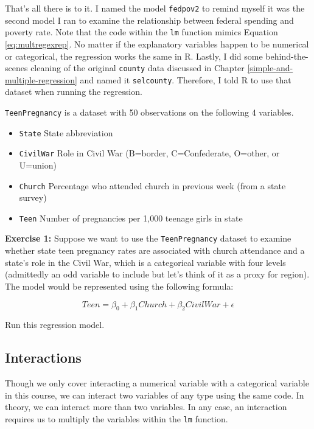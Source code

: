 \documentclass[
]{book}
\providecommand{\tightlist}{%
  \setlength{\itemsep}{0pt}\setlength{\parskip}{0pt}}
\newenvironment{rmdblock}[1]
  {\begin{shaded*}
  }
  {\end{shaded*}
  }
\newenvironment{learncheck}
  {\begin{rmdblock}{warning}}
  {\end{rmdblock}}
\begin{document}
That's all there is to it. I named the model \texttt{fedpov2} to remind myself it was the second model I ran to examine the relationship between federal spending and poverty rate. Note that the code within the \texttt{lm} function mimics Equation \eqref{eq:multregexrep}. No matter if the explanatory variables happen to be numerical or categorical, the regression works the same in R. Lastly, I did some behind-the-scenes cleaning of the original \texttt{county} data discussed in Chapter \ref{simple-and-multiple-regression} and named it \texttt{selcounty}. Therefore, I told R to use that dataset when running the regression.

\texttt{TeenPregnancy} is a dataset with 50 observations on the following 4 variables.

\begin{itemize}
\tightlist
\item
  \texttt{State} State abbreviation
\item
  \texttt{CivilWar} Role in Civil War (B=border, C=Confederate, O=other, or U=union)
\item
  \texttt{Church} Percentage who attended church in previous week (from a state survey)
\item
  \texttt{Teen} Number of pregnancies per 1,000 teenage girls in state
\end{itemize}

\begin{learncheck}
\textbf{Exercise 1:} Suppose we want to use the \texttt{TeenPregnancy}
dataset to examine whether state teen pregnancy rates are associated
with church attendance and a state's role in the Civil War, which is a
categorical variable with four levels (admittedly an odd variable to
include but let's think of it as a proxy for region). The model would be
represented using the following formula:

\begin{equation}
Teen = \beta_0 + \beta_1Church + \beta_2CivilWar + \epsilon
\end{equation}

Run this regression model.
\end{learncheck}

\hypertarget{interactions}{%
\subsection{Interactions}\label{interactions}}

Though we only cover interacting a numerical variable with a categorical variable in this course, we can interact two variables of any type using the same code. In theory, we can interact more than two variables. In any case, an interaction requires us to multiply the variables within the \texttt{lm} function.
\end{document}
